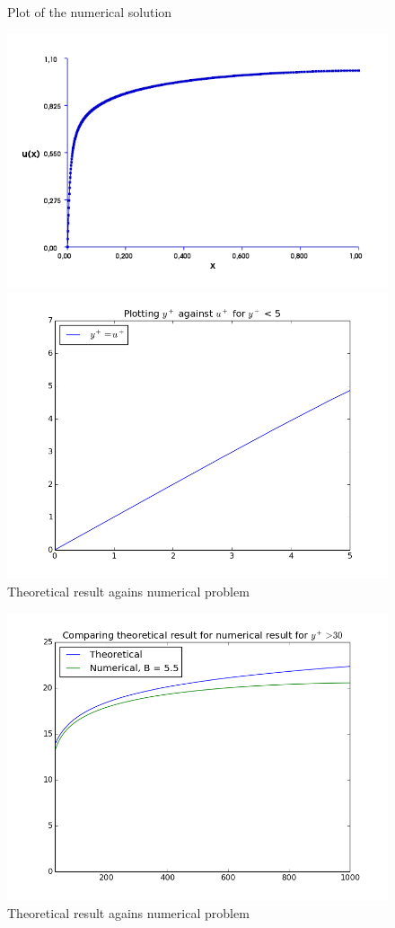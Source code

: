 \documentclass[a4paper,norsk]{article}
\begin{document}
\begin{figure}[h!]
	\centering
	\caption*{Plot of the numerical solution  }
	\includegraphics[scale = 0.6]{mand3/numerical.png}

	\caption*{Theoretical result agains numerical problem  }
	\includegraphics[scale = 0.6]{mand3/linear.png}	
\end{figure}
\newpage
\begin{figure}[h!]
	\centering
	\caption*{Theoretical result agains numerical problem }
	\includegraphics[scale = 0.6]{mand3/theo.png}
\end{figure}
\end{document}
